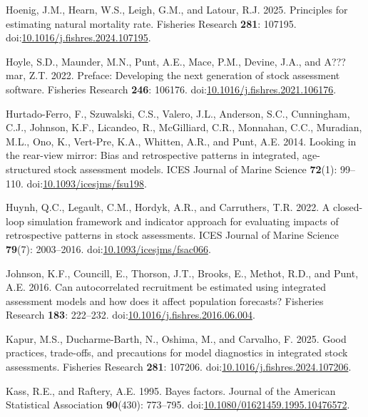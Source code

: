 \documentclass[
  12pt,
]{article}
\newlength{\cslhangindent}
\newlength{\cslentryspacingunit} %
\newenvironment{CSLReferences}[2] %
 {%
  \setlength{\parindent}{0pt}
  \ifodd #1
  \let\oldpar\par
  \def\par{\hangindent=\cslhangindent\oldpar}
  \fi
  \setlength{\parskip}{#2\cslentryspacingunit}
 }%
 {}
\begin{document}
\begin{CSLReferences}{1}{0}
\leavevmode{}%
Hoenig, J.M., Hearn, W.S., Leigh, G.M., and Latour, R.J. 2025.
Principles for estimating natural mortality rate. Fisheries Research
\textbf{281}: 107195.
doi:\href{https://doi.org/10.1016/j.fishres.2024.107195}{10.1016/j.fishres.2024.107195}.

\leavevmode{}%
Hoyle, S.D., Maunder, M.N., Punt, A.E., Mace, P.M., Devine, J.A., and
A???mar, Z.T. 2022. Preface: Developing the next generation of stock
assessment software. Fisheries Research \textbf{246}: 106176.
doi:\href{https://doi.org/10.1016/j.fishres.2021.106176}{10.1016/j.fishres.2021.106176}.

\leavevmode{}%
Hurtado-Ferro, F., Szuwalski, C.S., Valero, J.L., Anderson, S.C.,
Cunningham, C.J., Johnson, K.F., Licandeo, R., McGilliard, C.R.,
Monnahan, C.C., Muradian, M.L., Ono, K., Vert-Pre, K.A., Whitten, A.R.,
and Punt, A.E. 2014. Looking in the rear-view mirror: Bias and
retrospective patterns in integrated, age-structured stock assessment
models. ICES Journal of Marine Science \textbf{72}(1): 99--110.
doi:\href{https://doi.org/10.1093/icesjms/fsu198}{10.1093/icesjms/fsu198}.

\leavevmode{}%
Huynh, Q.C., Legault, C.M., Hordyk, A.R., and Carruthers, T.R. 2022. A
closed-loop simulation framework and indicator approach for evaluating
impacts of retrospective patterns in stock assessments. ICES Journal of
Marine Science \textbf{79}(7): 2003--2016.
doi:\href{https://doi.org/10.1093/icesjms/fsac066}{10.1093/icesjms/fsac066}.

\leavevmode{}%
Johnson, K.F., Councill, E., Thorson, J.T., Brooks, E., Methot, R.D.,
and Punt, A.E. 2016. Can autocorrelated recruitment be estimated using
integrated assessment models and how does it affect population
forecasts? Fisheries Research \textbf{183}: 222--232.
doi:\href{https://doi.org/10.1016/j.fishres.2016.06.004}{10.1016/j.fishres.2016.06.004}.

\leavevmode{}%
Kapur, M.S., Ducharme-Barth, N., Oshima, M., and Carvalho, F. 2025. Good
practices, trade-offs, and precautions for model diagnostics in
integrated stock assessments. Fisheries Research \textbf{281}: 107206.
doi:\href{https://doi.org/10.1016/j.fishres.2024.107206}{10.1016/j.fishres.2024.107206}.

\leavevmode{}%
Kass, R.E., and Raftery, A.E. 1995. Bayes factors. Journal of the
American Statistical Association \textbf{90}(430): 773--795.
doi:\href{https://doi.org/10.1080/01621459.1995.10476572}{10.1080/01621459.1995.10476572}.


\end{CSLReferences}
\end{document}
